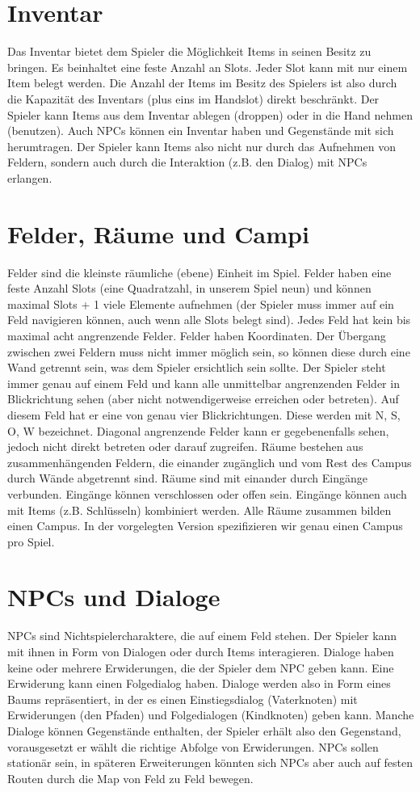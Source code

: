 \newpage
\section{Inventar}
Das Inventar bietet dem \gls{Spieler} die Möglichkeit \glspl{Item} in seinen Besitz zu bringen. Es beinhaltet
eine feste Anzahl an Slots. Jeder Slot kann mit nur einem \gls{Item} belegt werden. Die Anzahl der Items im
Besitz des Spielers ist also durch die Kapazität des Inventars (plus eins im Handslot) direkt beschränkt.
Der Spieler kann Items aus dem Inventar ablegen (droppen) oder in die Hand nehmen (benutzen). Auch NPCs können
ein Inventar haben und Gegenstände mit sich herumtragen. Der Spieler kann Items also nicht nur durch das
Aufnehmen von Feldern, sondern auch durch die Interaktion (z.B. den Dialog) mit NPCs erlangen.

\section{Felder, Räume und Campi}
Felder sind die kleinste räumliche (ebene) Einheit im Spiel. Felder haben eine feste Anzahl Slots (eine 
Quadratzahl, in unserem Spiel neun) und können maximal Slots + 1 viele Elemente aufnehmen (der Spieler muss 
immer auf ein Feld
navigieren können, auch wenn alle Slots belegt sind). Jedes Feld hat kein bis maximal acht
angrenzende Felder. Felder haben Koordinaten. Der Übergang zwischen zwei Feldern muss nicht immer möglich
sein, so können diese durch eine Wand getrennt sein, was dem Spieler ersichtlich sein sollte.
Der Spieler steht immer genau auf einem Feld und kann alle unmittelbar angrenzenden Felder in Blickrichtung
sehen (aber 
nicht notwendigerweise erreichen oder betreten). Auf diesem Feld hat er eine von genau vier 
Blickrichtungen. Diese werden mit N, S, O, W bezeichnet. Diagonal angrenzende Felder kann er gegebenenfalls
sehen, jedoch nicht direkt betreten oder darauf zugreifen.
Räume bestehen aus zusammenhängenden Feldern, die einander zugänglich und vom Rest des \gls{Campus} durch
Wände abgetrennt sind. Räume sind mit einander durch Eingänge verbunden. Eingänge können verschlossen oder
offen sein. Eingänge können auch mit Items (z.B. Schlüsseln) kombiniert werden. Alle Räume zusammen bilden
einen Campus. In der vorgelegten Version spezifizieren wir genau einen Campus pro Spiel.

\section{NPCs und Dialoge}
NPCs sind Nichtspielercharaktere, die auf einem Feld stehen. Der Spieler kann mit ihnen in Form von Dialogen
oder durch Items interagieren. Dialoge haben keine oder mehrere Erwiderungen, die der Spieler dem NPC geben
kann. Eine Erwiderung kann einen Folgedialog haben. Dialoge werden also in Form eines Baums repräsentiert,
in der es einen Einstiegsdialog (Vaterknoten) mit Erwiderungen (den Pfaden) und Folgedialogen (Kindknoten)
geben kann. Manche Dialoge können Gegenstände enthalten, der Spieler erhält also den Gegenstand, vorausgesetzt
er wählt die richtige Abfolge von Erwiderungen. NPCs sollen stationär sein, in späteren Erweiterungen könnten
sich NPCs aber auch auf festen Routen durch die Map von Feld zu Feld bewegen.

